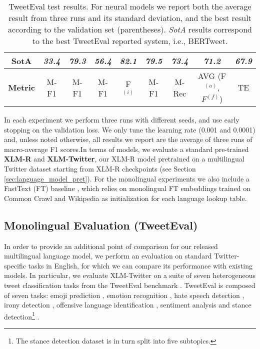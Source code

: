 \documentclass[10pt, a4paper]{article}
\begin{document}
\begin{table*}
{\begin{tabular}{c|c|c|c|c|c|c|c||c}
SotA &
  \textit{33.4} &
  \textit{79.3} &
  \textit{56.4} &
  \textit{82.1} &
  \textit{79.5} &
  \textit{73.4} &
  \textit{71.2} &


 
  \textit{67.9} \\ \hline \hline
\multicolumn{1}{c|}{\textbf{Metric}} &
  M-F1 &
  M-F1 &
  M-F1 &
  F$^{(i)}$ &
  M-F1 &
  M-Rec &
  AVG (F$^{(a)}$,$F^{(f)}$) & TE
   \\ \bottomrule
\end{tabular}
}
\caption{\label{table-results} TweetEval test results. For neural models we report both the average result from three runs and its standard deviation, and the best result according to the validation set (parentheses). \textit{SotA} results correspond to the best TweetEval reported system, i.e., BERTweet.}
\end{table*}


In each experiment we perform three runs with different seeds, and use early stopping on the validation loss. We only tune the learning rate (0.001 and 0.0001) and, unless noted otherwise, all results we report are the average of three runs of macro-average F1 scores.In terms of models, we evaluate a standard pre-trained \textbf{XLM-R} and \textbf{XLM-Twitter}, our XLM-R model pretrained on a multilingual Twitter dataset starting from XLM-R checkpoints (see Section \ref{sec:language_model_pret}). For the monolingual experiments we also include a FastText (FT) baseline \cite{joulin-etal-2017-bag}, which relies on monolingual FT embeddings trained on Common Crawl and Wikipedia \cite{grave2018learning} as initialization for each language lookup table.








\subsection{Monolingual Evaluation (TweetEval)}
\label{mono:eval}

In order to provide an additional point of comparison for our released multilingual language model, we perform an evaluation on standard Twitter-specific tasks in English, for which we can compare its performance with existing models. In particular, we evaluate XLM-Twitter on a suite of seven heterogeneous tweet classification tasks from the TweetEval benchmark \cite{barbieri-etal-2020-tweeteval}. TweetEval is composed of seven tasks: emoji prediction \cite{barbieri2018semeval}, emotion recognition \cite{mohammad2018semeval}, hate speech detection \cite{basile-etal-2019-semeval}, irony detection \cite{van2018semeval}, offensive language identification \cite{zampieri-etal-2019-semeval}, sentiment analysis \cite{rosenthal2019semeval} and stance detection\footnote{The stance detection dataset is in turn split into five subtopics.} \cite{mohammad2016semeval}.
\end{document}
